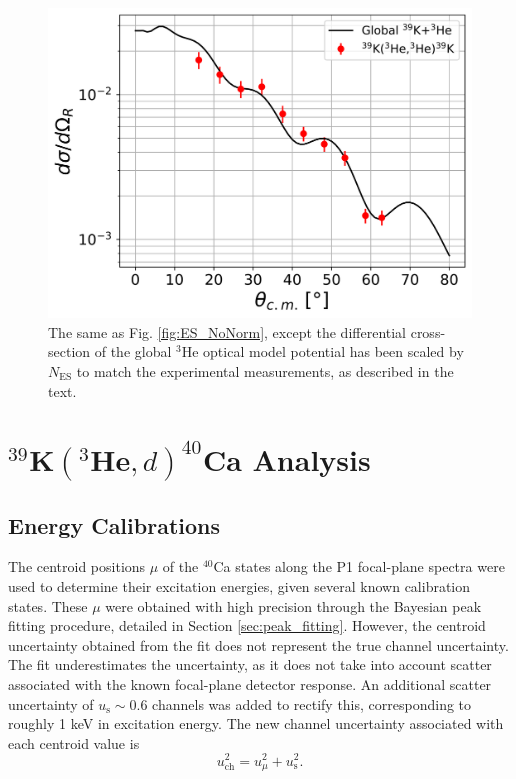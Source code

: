 \begin{figure}[t]
\centering
\includegraphics[width=6.5in]{Chapter-6/figs/global_Norm.png}
\caption{\label{fig:ES_Norm}The same as Fig. \ref{fig:ES_NoNorm}, except the differential cross-section of the global $^{3}$He optical model potential has been scaled by $N_{\mathrm{ES}}$ to match the experimental measurements, as described in the text.}
\end{figure}

\section{$^{39}\mathrm{\textbf{K}}(^{3}\mathrm{\textbf{He}},d)^{40}\mathrm{\textbf{Ca}}$ Analysis} \label{sec:analysis_3He_d}

\subsection{Energy Calibrations} \label{subsec:cal}

The centroid positions $\mu$ of the $^{40}$Ca states along the P1 focal-plane spectra were used to determine their excitation energies, given several known calibration states. These $\mu$ were obtained with high precision through the Bayesian peak fitting procedure, detailed in Section \ref{sec:peak_fitting}. However, the centroid uncertainty obtained from the fit does not represent the true channel uncertainty. The fit underestimates the uncertainty, as it does not take into account scatter associated with the known focal-plane detector response. An additional scatter uncertainty of $u_{\mathrm{s}} \sim 0.6$ channels was added to rectify this, corresponding to roughly 1 keV in excitation energy. The new channel uncertainty associated with each centroid value is
\begin{equation}
u_{\mathrm{ch}}^{2} = u_{\mu}^{2} + u_{\mathrm{s}}^{2}.
\end{equation}

